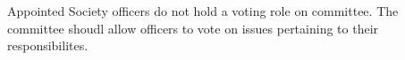 \begin{clause}
    Appointed Society officers do not hold a voting role on committee. The committee shoudl allow officers to vote on issues pertaining to their responsibilites.
\end{clause}